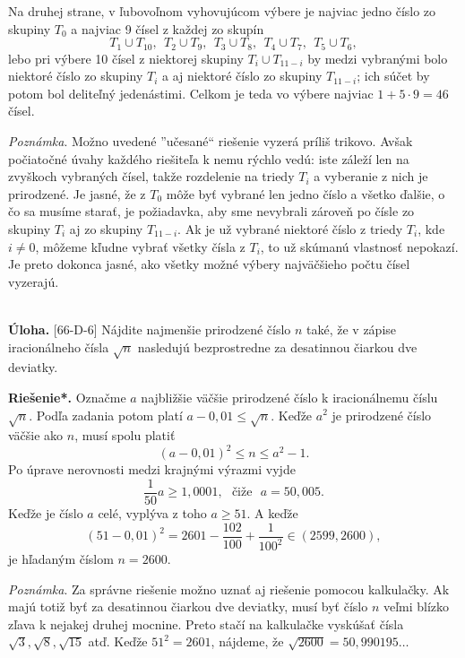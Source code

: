 \documentclass[11pt,a4paper,oneside,final]{book}
\newcommand{\ul}{\textbf{Úloha.} }
\newcommand{\rieh}{\textbf{Riešenie*.} }
\begin{document}
Na druhej strane, v ľubovoľnom vyhovujúcom výbere je najviac jedno číslo zo skupiny $T_0$ a najviac 9 čísel z každej zo skupín
$$ T_1 \cup T_{10}, \ \ T_2 \cup T_9, \ \ T_3 \cup T_8, \ \  T_4 \cup T_7, \ \ T_5 \cup T_6,$$
lebo pri výbere 10 čísel z niektorej skupiny $T_i \cup T_{11-i}$ by medzi vybranými bolo niektoré číslo zo skupiny $T_i$ a aj niektoré číslo zo skupiny $T_{11-i}$; ich súčet by potom bol deliteľný jedenástimi. Celkom je teda vo výbere najviac $1 + 5 \cdot 9 = 46$ čísel.

\textit{Poznámka}. Možno uvedené ”učesané“ riešenie vyzerá príliš trikovo. Avšak počiatočné úvahy každého riešiteľa k nemu rýchlo vedú: iste záleží len na zvyškoch vybraných čísel, takže rozdelenie na triedy $T_i$ a vyberanie z nich je prirodzené. Je jasné, že z $T_0$ môže byť vybrané len jedno číslo a všetko ďalšie, o čo sa musíme starať, je požiadavka, aby sme nevybrali zároveň po čísle zo skupiny $T_i$ aj zo skupiny $T_{11-i}$. Ak je už vybrané niektoré číslo z triedy $T_i$, kde $i\neq 0$, môžeme kľudne vybrať všetky čísla z $T_i$, to už skúmanú vlastnosť nepokazí. Je preto dokonca jasné, ako všetky možné výbery najväčšieho počtu čísel vyzerajú.\\
\\
\begin{tcolorbox}[breakable,notitle,boxrule=0pt,colback=light-gray,colframe=light-gray]\ul [66-D-6]
Nájdite najmenšie prirodzené číslo $n$ také, že v zápise iracionálneho čísla $\sqrt{n}$ nasledujú bezprostredne za desatinnou čiarkou dve deviatky.

\end{tcolorbox}

\rieh Označme $a$ najbližšie väčšie prirodzené číslo k iracionálnemu číslu $\sqrt{n}$. Podľa zadania potom platí $a - 0,01 \leq \sqrt{n}$. Keďže $a^2$ je prirodzené číslo väčšie ako $n$, musí spolu platiť
$$(a - 0,01)^2 \leq n \leq a^2 - 1.$$
Po úprave nerovnosti medzi krajnými výrazmi vyjde
$$\frac{1}{50} a \geq 1,000 1, \ \ \ \text{čiže} \ \ \  a = 50,005.$$
Keďže je číslo $a$ celé, vyplýva z toho $a \geq 51$. A keďže
$$(51 - 0,01)^2= 2 601 -\frac{102}{100}+\frac{1}{100^2}\in (2 599, 2 600),$$
je hľadaným číslom $n = 2 600$.

\textit{Poznámka}. Za správne riešenie možno uznať aj riešenie pomocou kalkulačky. Ak majú totiž byť za desatinnou čiarkou dve deviatky, musí byť číslo $n$ veľmi blízko zľava k nejakej druhej mocnine. Preto stačí na kalkulačke vyskúšať čísla $\sqrt{3}, \sqrt{8}, \sqrt{15}$ atď. Keďže $51^2 = 2601$, nájdeme, že $\sqrt{2600} = 50,990 195\ldots$
\newpage
\end{document}
